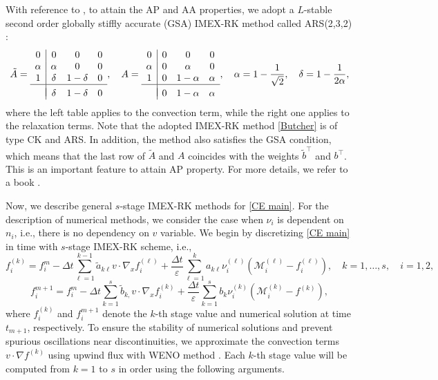 \documentclass[10pt,reqno]{amsart}
\numberwithin{equation}{section}
\begin{document}
With reference to \cite{BPR}, to attain the AP and AA properties, we adopt a $L$-stable second order globally stiffly accurate (GSA) IMEX-RK method called ARS(2,3,2) \cite{ARS}:
	\begin{align}\label{Butcher}
		\tilde{A}=\begin{array}{c|ccc}
			0& 0 &0 & 0\\
			\alpha& \alpha &0 & 0\\
			1 &\delta& 1-\delta & 0\\
			\hline \\[-3mm]
			& \delta& 1-\delta & 0
		\end{array},\quad A=\begin{array}{c|ccc}
			0& 0 &0 & 0\\
			\alpha& 0&\alpha &0 \\
			1 &0& 1-\alpha &\alpha \\
			\hline \\[-3mm]
			& 0&1-\alpha & \alpha
		\end{array},\quad \alpha = 1-\frac{1}{\sqrt{2}},\quad \delta = 1-\frac{1}{2\alpha},
	\end{align}
where the left table applies to the convection term, while the right one applies to the relaxation terms. Note that the adopted IMEX-RK method \eqref{Butcher} is of type CK and ARS. In addition, the method also satisfies the GSA condition, which means that the last row of $\tilde{A}$ and $A$ coincides with the weights $\tilde{b}^\top$ and $b^\top$. This is an important feature to attain AP property. For more details, we refer to a book \cite{BPR}.


Now, we describe general $s$-stage IMEX-RK methods for \eqref{CE main}. For the description of numerical methods, we consider the case when $\nu_i$ is dependent on $n_i$, i.e., there is no dependency on $v$ variable. We begin by discretizing \eqref{CE main} in time with $s$-stage IMEX-RK scheme, i.e., 
\begin{equation}\label{IMEXcomp}
	f_i^{(k)} = f_i^{m} - \Delta t\sum_{\ell=1}^{k-1}\tilde{a}_{k\ell} v \cdot \nabla_x f_i^{(\ell)} + \frac{\Delta t}{\varepsilon}\sum_{\ell=1}^{k}a_{k\ell}\nu_i^{(\ell)}\left(\mathcal{M}_i^{(\ell)} - f_i^{(\ell)}\right), \quad k = 1,\dots,s, \quad i=1,2,
\end{equation}
\begin{equation}\label{solnum}
	f_i^{m+1} = f_i^{m} - \Delta t\sum_{k=1}^{s}\tilde{b}_{k,} v \cdot \nabla_x f_i^{(k)} + \frac{\Delta t}{\varepsilon}\sum_{k=1}^{s}{b}_{k}\nu_i^{(k)}\left(\mathcal{M}_i^{(k)} - f^{(k)}\right),
\end{equation}
where $f_i^{(k)}$ and $f_i^{m+1}$ denote the $k$-th stage value and numerical solution at time $t_{m+1}$, respectively. 
To ensure the stability of numerical solutions and prevent spurious oscillations near discontinuities, we approximate the convection terms $v\cdot \nabla f^{(k)}$  using upwind flux with WENO method \cite{CWS}. Each $k$-th stage value will be computed from $k=1$ to $s$ in order using the following arguments.
\end{document}
